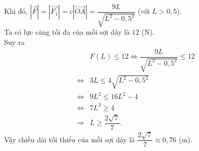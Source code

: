 \begin{bt}
{		Khi đó, $\left|\overrightarrow{F}\right| = \left|\overrightarrow{F_1}\right| = c\left|\overrightarrow{OA}\right| = \dfrac{9L}{\sqrt{L^2 - 0{,}5^2}}$ (với $L  > 0{,}5$).\\
		Ta có lực căng tối đa của  mỗi sợi dây là $12$ (N).\\
		Suy ra \begin{eqnarray*}
		&& F(L) \le 12 \Leftrightarrow \dfrac{9L}{\sqrt{L^2 -  0{,}5^2}} \le 12 \\
		&\Leftrightarrow& 3L \le 4\sqrt{L^2 - 0{,}5^2}\\  &\Leftrightarrow& 9L^2 \le 16L^2 - 4 \\
		&\Leftrightarrow&  7L^2 \ge 4\\
		&\Rightarrow&  L \ge \dfrac{2\sqrt{7}}{7}.
	\end{eqnarray*}
Vậy chiều dài tối thiểu  của mỗi sợi dây là $\dfrac{2\sqrt{7}}{7} \approx 0{,}76$ (m).}
\end{bt}


